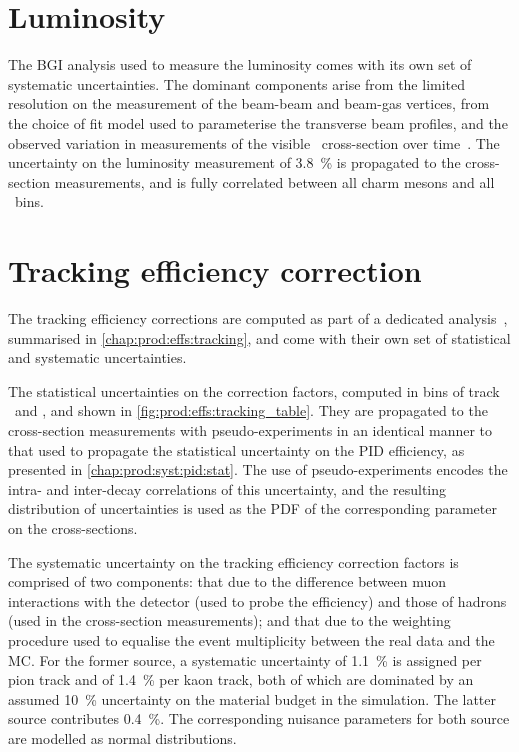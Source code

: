 \section{Luminosity}
\label{chap:prod:syst:lumi}

The \acl{BGI} analysis used to measure the luminosity comes with its own set of 
systematic uncertainties.
The dominant components arise from the limited resolution on the measurement of 
the beam-beam and beam-gas vertices, from the choice of fit model used to 
parameterise the transverse beam profiles, and the observed variation in 
measurements of the visible \pp\ cross-section over 
time~\cite{LHCb-PAPER-2014-047}.
The uncertainty on the luminosity measurement of \SI{3.8}{\%} is propagated to 
the cross-section measurements, and is fully correlated between all charm 
mesons and all \pTy\ bins.

\section{Tracking efficiency correction}
\label{chap:prod:syst:tracking}

The tracking efficiency corrections are computed as part of a dedicated 
analysis~\cite{Aaij:2014pwa}, summarised in \cref{chap:prod:effs:tracking}, and 
come with their own set of statistical and systematic uncertainties.

The statistical uncertainties on the correction factors, computed in bins of 
track \ptot\ and \Eta, and shown in \cref{fig:prod:effs:tracking_table}.
They are propagated to the cross-section measurements with pseudo-experiments 
in an identical manner to that used to propagate the statistical uncertainty on 
the \ac{PID} efficiency, as presented in \cref{chap:prod:syst:pid:stat}.
The use of pseudo-experiments encodes the intra- and inter-decay correlations 
of this uncertainty, and the resulting distribution of uncertainties is used as 
the \ac{PDF} of the corresponding parameter on the cross-sections.

The systematic uncertainty on the tracking efficiency correction factors is 
comprised of two components: that due to the difference between muon 
interactions with the detector (used to probe the efficiency) and those of 
hadrons (used in the cross-section measurements); and that due to the weighting 
procedure used to equalise the event multiplicity between the real data and the 
\ac{MC}.
For the former source, a systematic uncertainty of \SI{1.1}{\percent} is 
assigned per pion track and of \SI{1.4}{\percent} per kaon track, both of which 
are dominated by an assumed \SI{10}{\percent} uncertainty on the material 
budget in the simulation.
The latter source contributes \SI{0.4}{\percent}.
The corresponding nuisance parameters for both source are modelled as normal 
distributions.


